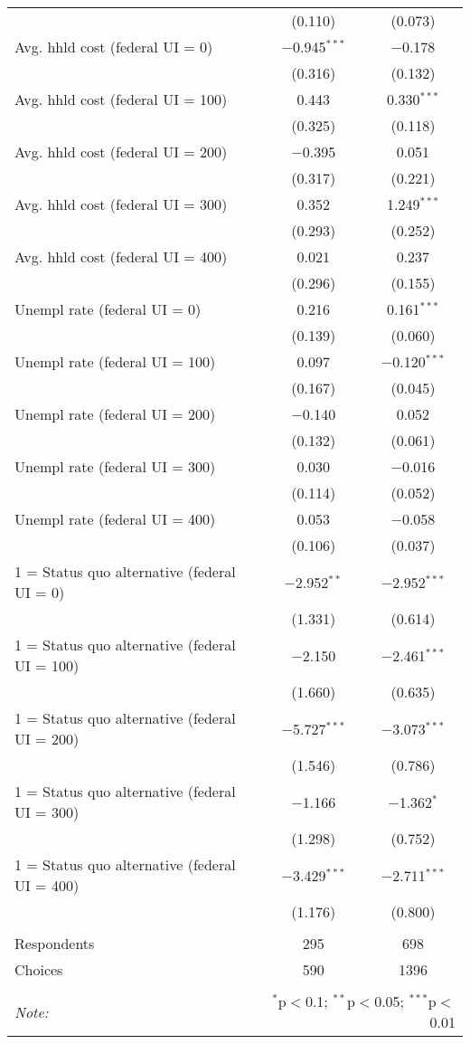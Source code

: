 \begin{table}[!htbp]
\begin{tabular}{@{\extracolsep{5pt}}lcc}
  & (0.110) & (0.073) \\ 
  Avg. hhld cost (federal UI = 0) & $-$0.945$^{***}$ & $-$0.178 \\ 
  & (0.316) & (0.132) \\ 
  Avg. hhld cost (federal UI = 100) & 0.443 & 0.330$^{***}$ \\ 
  & (0.325) & (0.118) \\ 
  Avg. hhld cost (federal UI = 200) & $-$0.395 & 0.051 \\ 
  & (0.317) & (0.221) \\ 
  Avg. hhld cost (federal UI = 300) & 0.352 & 1.249$^{***}$ \\ 
  & (0.293) & (0.252) \\ 
  Avg. hhld cost (federal UI = 400) & 0.021 & 0.237 \\ 
  & (0.296) & (0.155) \\ 
  Unempl rate (federal UI = 0) & 0.216 & 0.161$^{***}$ \\ 
  & (0.139) & (0.060) \\ 
  Unempl rate (federal UI = 100) & 0.097 & $-$0.120$^{***}$ \\ 
  & (0.167) & (0.045) \\ 
  Unempl rate (federal UI = 200) & $-$0.140 & 0.052 \\ 
  & (0.132) & (0.061) \\ 
  Unempl rate (federal UI = 300) & 0.030 & $-$0.016 \\ 
  & (0.114) & (0.052) \\ 
  Unempl rate (federal UI = 400) & 0.053 & $-$0.058 \\ 
  & (0.106) & (0.037) \\ 
  1 = Status quo alternative (federal UI = 0) & $-$2.952$^{**}$ & $-$2.952$^{***}$ \\ 
  & (1.331) & (0.614) \\ 
  1 = Status quo alternative (federal UI = 100) & $-$2.150 & $-$2.461$^{***}$ \\ 
  & (1.660) & (0.635) \\ 
  1 = Status quo alternative (federal UI = 200) & $-$5.727$^{***}$ & $-$3.073$^{***}$ \\ 
  & (1.546) & (0.786) \\ 
  1 = Status quo alternative (federal UI = 300) & $-$1.166 & $-$1.362$^{*}$ \\ 
  & (1.298) & (0.752) \\ 
  1 = Status quo alternative (federal UI = 400) & $-$3.429$^{***}$ & $-$2.711$^{***}$ \\ 
  & (1.176) & (0.800) \\ 
 \hline \\[-1.8ex] 
Respondents & 295 & 698\\ 
 Choices & 590 & 1396\\ 
\hline 
\hline \\[-1.8ex] 
\textit{Note:}  & \multicolumn{2}{r}{$^{*}$p$<$0.1; $^{**}$p$<$0.05; $^{***}$p$<$0.01} \\ 
\end{tabular} 
\end{table} 
